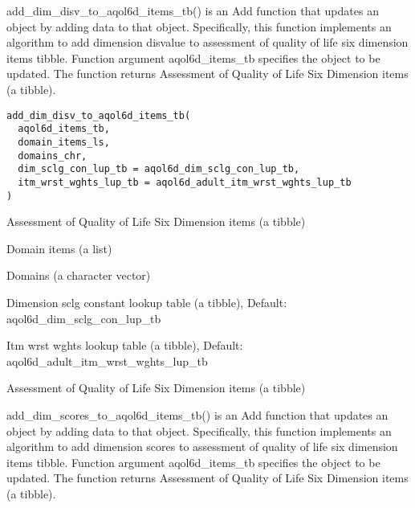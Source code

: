 \documentclass[a4paper]{book}
\begin{document}
%
\begin{Description}\relax
add\_dim\_disv\_to\_aqol6d\_items\_tb() is an Add function that updates an object by adding data to that object. Specifically, this function implements an algorithm to add dimension disvalue to assessment of quality of life six dimension items tibble. Function argument aqol6d\_items\_tb specifies the object to be updated. The function returns Assessment of Quality of Life Six Dimension items (a tibble).
\end{Description}
%
\begin{Usage}
\begin{verbatim}
add_dim_disv_to_aqol6d_items_tb(
  aqol6d_items_tb,
  domain_items_ls,
  domains_chr,
  dim_sclg_con_lup_tb = aqol6d_dim_sclg_con_lup_tb,
  itm_wrst_wghts_lup_tb = aqol6d_adult_itm_wrst_wghts_lup_tb
)
\end{verbatim}
\end{Usage}
%
\begin{Arguments}
\begin{ldescription}
\item[\code{aqol6d\_items\_tb}] Assessment of Quality of Life Six Dimension items (a tibble)

\item[\code{domain\_items\_ls}] Domain items (a list)

\item[\code{domains\_chr}] Domains (a character vector)

\item[\code{dim\_sclg\_con\_lup\_tb}] Dimension sclg constant lookup table (a tibble), Default: aqol6d\_dim\_sclg\_con\_lup\_tb

\item[\code{itm\_wrst\_wghts\_lup\_tb}] Itm wrst wghts lookup table (a tibble), Default: aqol6d\_adult\_itm\_wrst\_wghts\_lup\_tb
\end{ldescription}
\end{Arguments}
%
\begin{Value}
Assessment of Quality of Life Six Dimension items (a tibble)
\end{Value}
%
\begin{Description}\relax
add\_dim\_scores\_to\_aqol6d\_items\_tb() is an Add function that updates an object by adding data to that object. Specifically, this function implements an algorithm to add dimension scores to assessment of quality of life six dimension items tibble. Function argument aqol6d\_items\_tb specifies the object to be updated. The function returns Assessment of Quality of Life Six Dimension items (a tibble).
\end{Description}
\end{document}
